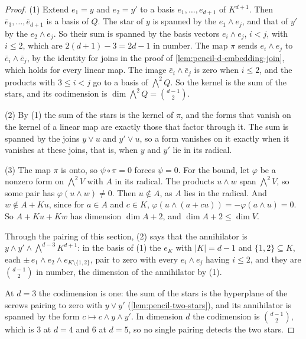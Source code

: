 \begin{proof}
  \leanok
  (1) Extend $e_1 = y$ and $e_2 = y'$ to a basis $e_1, \dots, e_{d+1}$ of
  $K^{d+1}$. Then $\bar e_3, \dots, \bar e_{d+1}$ is a basis of $Q$. The
  star of $y$ is spanned by the $e_1 \wedge e_j$, and that of $y'$ by the
  $e_2 \wedge e_j$. So their sum is spanned by the basis vectors
  $e_i \wedge e_j$, $i < j$, with $i \le 2$, which are
  $2(d + 1) - 3 = 2d - 1$ in number. The map $\pi$ sends
  $e_i \wedge e_j$ to $\bar e_i \wedge \bar e_j$, by the identity for
  joins in the proof of \cref{lem:pencil-d-embedding-join}, which holds
  for every linear map. The image $\bar e_i \wedge \bar e_j$ is zero when
  $i \le 2$, and the products with $3 \le i < j$ go to a basis of
  $\bigwedge^2 Q$. So the kernel is the sum of the stars, and its
  codimension is $\dim \bigwedge^2 Q = \binom{d-1}{2}$.

  (2) By (1) the sum of the stars is the kernel of $\pi$, and the forms
  that vanish on the kernel of a linear map are exactly those that factor
  through it. The sum is spanned by the joins $y \vee u$ and $y' \vee u$,
  so a form vanishes on it exactly when it vanishes at these joins, that
  is, when $y$ and $y'$ lie in its radical.

  (3) The map $\pi$ is onto, so $\psi \circ \pi = 0$ forces $\psi = 0$.
  For the bound, let $\varphi$ be a nonzero form on $\bigwedge^2 V$ with
  $A$ in its radical. The products $u \wedge w$ span $\bigwedge^2 V$, so
  some pair has $\varphi(u \wedge w) \neq 0$. Then $u \notin A$, as $A$
  lies in the radical. And $w \notin A + K u$, since for $a \in A$ and
  $c \in K$,
  $\varphi(u \wedge (a + c u)) = -\varphi(a \wedge u) = 0$. So
  $A + K u + K w$ has dimension $\dim A + 2$, and $\dim A + 2 \le \dim V$.

  Through the pairing of this section, (2) says that the annihilator is
  $y \wedge y' \wedge \bigwedge^{d-3} K^{d+1}$: in the basis of (1) the
  $e_K$ with $|K| = d - 1$ and $\{1, 2\} \subseteq K$, each
  $\pm\, e_1 \wedge e_2 \wedge e_{K \setminus \{1, 2\}}$, pair to zero
  with every $e_i \wedge e_j$ having $i \le 2$, and they are
  $\binom{d-1}{2}$ in number, the dimension of the annihilator by (1).

  At $d = 3$ the codimension is one: the sum of the stars is the
  hyperplane of the screws pairing to zero with $y \vee y'$
  (\cref{lem:pencil-two-stars}), and its annihilator is spanned by the
  form $c \mapsto c \wedge y \wedge y'$. In dimension $d$ the codimension
  is $\binom{d-1}{2}$, which is $3$ at $d = 4$ and $6$ at $d = 5$, so no
  single pairing detects the two stars.
\end{proof}

